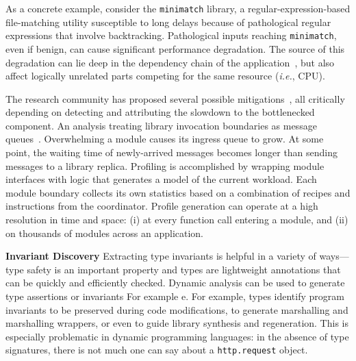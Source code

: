 \documentclass[letterpaper,twocolumn,10pt]{article}
\def\ie{{\em i.e.}, }
\newcommand{\heading}[1]{\vspace{2pt}\noindent\textbf{#1}\enspace}
\newcommand{\ttt}[1]{\texttt{#1}}
\newcommand{\fixme}[1]{{\color{red}#1}}
\begin{document}
As a concrete example, consider the \ttt{minimatch} library, a regular-expression-based file-matching utility susceptible to long delays because of pathological regular expressions that involve backtracking.
Pathological inputs reaching \ttt{minimatch}, even if benign, can cause significant performance degradation.
The source of this degradation can lie deep in the dependency chain of the application~\cite{crosby2003denial}, but also affect logically unrelated parts competing for the same resource (\ie CPU).

The research community has proposed several possible mitigations~\cite{}, all critically depending on detecting and attributing the slowdown to the bottlenecked component.
An analysis 
treating library invocation boundaries as message queues~\cite{scheme:98, duality:79}.
Overwhelming a module causes its ingress queue to grow.
At some point, the waiting time of newly-arrived messages becomes longer than sending messages to a library replica.
Profiling is accomplished by wrapping module interfaces with logic that generates a model of the current workload.
Each module boundary collects its own statistics based on a combination of recipes and instructions from the coordinator.
Profile generation can operate at a high resolution in time and space:
  (i) at every function call entering a module, and (ii) on thousands of modules across an application.



\heading{Invariant Discovery}
Extracting type invariants is helpful in a variety of ways---type safety is an important property and types are lightweight annotations that can be quickly and efficiently checked.
Dynamic analysis can be used to generate type assertions or invariants
For example
e.
For example, types identify program invariants to be preserved during code modifications, to generate marshalling and marshalling wrappers, or even to guide library synthesis and regeneration.
This is especially problematic in dynamic programming languages:
  in the absence of type signatures, there is not much one can say about a \ttt{http.request} object.
\end{document}
